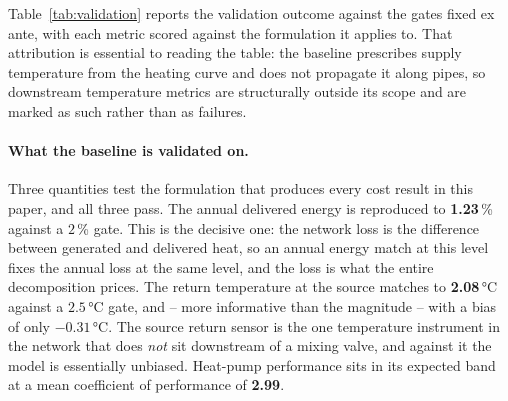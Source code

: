 
Table~\ref{tab:validation} reports the validation outcome against the gates fixed ex ante,
with each metric scored against the formulation it applies to. That attribution is
essential to reading the table: the baseline prescribes supply temperature from the heating
curve and does not propagate it along pipes, so downstream temperature metrics are
structurally outside its scope and are marked as such rather than as failures.

\paragraph{What the baseline is validated on.}
Three quantities test the formulation that produces every cost result in this paper, and
all three pass. The annual delivered energy is reproduced to \textbf{1.23}\,\% against a
$2$\,\% gate. This is the decisive one: the network loss is the difference between generated
and delivered heat, so an annual energy match at this level fixes the annual loss at the
same level, and the loss is what the entire decomposition prices. The return temperature at
the source matches to \textbf{2.08}\,°C against a $2.5$\,°C gate, and -- more informative
than the magnitude -- with a bias of only $-0.31$\,°C. The source return sensor is the one
temperature instrument in the network that does \emph{not} sit downstream of a mixing valve,
and against it the model is essentially unbiased. Heat-pump performance sits in its expected
band at a mean coefficient of performance of \textbf{2.99}.

